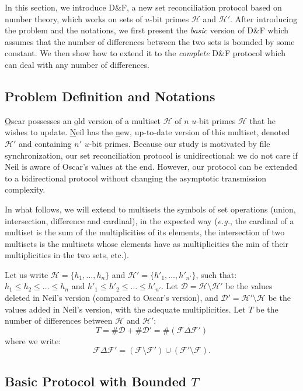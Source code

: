 \documentclass[11pt]{llncs}
\newcommand{\Set}{\mathcal{H}}
\newcommand{\SetD}{\mathcal{D}}
\newcommand{\Files}{\mathcal{F}}
\newcommand{\df}{D\&F\xspace}
\newcommand{\eg}{\textit{e.g.}\xspace}
\newcommand{\comm}[1]{\marginpar{%
\vskip-\baselineskip %
\raggedright\footnotesize
\itshape\hrule\smallskip#1\par\smallskip\hrule}}
\begin{document}
In this section, we introduce \df, a new set reconciliation protocol based on number theory, which works on sets of $u$-bit primes $\Set$ and $\Set'$.
After introducing the problem and the notations, we first present the \emph{basic} version of \df which assumes that the number of differences between the two sets is bounded by some constant.
We then show how to extend it to the \emph{complete} \df protocol which can deal with any number of differences.

\subsection{Problem Definition and Notations}

\underline{O}scar possesses an \underline{o}ld version of a multiset $\Set$ of $n$ $u$-bit primes $\Set$ that he wishes to update.
\underline{N}eil has the \underline{n}ew, up-to-date version of this multiset, denoted $\Set'$ and containing $n'$ $u$-bit primes.
Because our study is motivated by file synchronization, our set reconciliation protocol is unidirectional: we do not care if Neil is aware of Oscar's values at the end. However, our protocol can be extended to a bidirectional protocol without changing the asymptotic transmission complexity.

In what follows, we will extend to multisets the symbols of set operations (union, intersection, difference and cardinal), in the expected way (\eg, the cardinal of a multiset is the sum of the multiplicities of its elements, the intersection of two multisets is the multisets whose elements have as multiplicities the min of their multiplicities in the two sets, etc.).

Let us write $\Set = \{h_1,\dots,h_n\}$ and $\Set' = \{h'_1,\dots,h'_{n'}\}$, such that: $h_1 \leq h_2 \leq \dots \leq h_n$ and $h'_1 \leq h'_2 \leq \dots \leq h'_{n'}$.
Let $\SetD = \Set \setminus \Set'$ be the values deleted in Neil's version (compared to Oscar's version), and $\SetD' = \Set' \setminus \Set$ be the values added in Neil's version, with the adequate multiplicities.
Let $T$ be the number of differences between $\Set$ and $\Set'$:
\[ T = \# \SetD + \# \SetD' = \# \left( \Files \Delta \Files' \right) \]
where we write:
\[ \Files \Delta \Files' = (\Files \setminus \Files') \cup (\Files' \setminus \Files). \]

\subsection{Basic Protocol with Bounded $T$}
\label{sec:basic}
\end{document}
